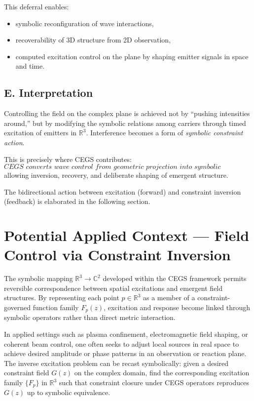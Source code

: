 \documentclass[11pt]{article}
\theoremstyle{plain}
\theoremstyle{definition}
\theoremstyle{remark}
\begin{document}
This deferral enables:
\begin{itemize}[leftmargin=*]
\item symbolic reconfiguration of wave interactions,
\item recoverability of 3D structure from 2D observation,
\item computed excitation control on the plane by shaping emitter signals in space and time.
\end{itemize}

\subsection*{E. Interpretation}
Controlling the field on the complex plane is achieved not by “pushing intensities around,”
but by modifying the symbolic relations among carriers through timed excitation of emitters
in \(\mathbb{R}^3\).  
Interference becomes a form of \emph{symbolic constraint action}.

\bigskip
\noindent
This is precisely where CEGS contributes:
\[
\textit{CEGS converts wave control from geometric projection into symbolic constraint dynamics,}
\]
allowing inversion, recovery, and deliberate shaping of emergent structure.

\vspace{8pt}


\medskip
\noindent
The bidirectional action between excitation (forward) and constraint inversion (feedback)
is elaborated in the following section.



\section*{Potential Applied Context — Field Control via Constraint Inversion}

\noindent
The symbolic mapping \( \mathbb{R}^3 \rightarrow \mathbb{C}^2 \) developed within the CEGS framework
permits reversible correspondence between spatial excitations and emergent field structures.
By representing each point \(p \in \mathbb{R}^3\) as a member of a constraint-governed function family \(F_p(z)\),
excitation and response become linked through symbolic operators rather than direct metric interaction.

\vspace{4pt}
\noindent
In applied settings such as plasma confinement, electromagnetic field shaping, or coherent beam control,
one often seeks to adjust local sources in real space to achieve desired amplitude or phase patterns
in an observation or reaction plane.
The inverse excitation problem can be recast symbolically:
given a desired constraint field \(G(z)\) on the complex domain,
find the corresponding excitation family \(\{F_p\}\) in \(\mathbb{R}^3\) such that
constraint closure under CEGS operators reproduces \(G(z)\) up to symbolic equivalence.
\end{document}
